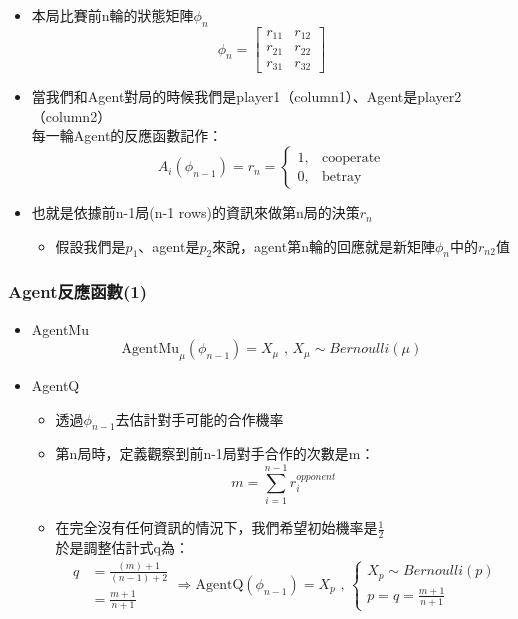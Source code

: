\documentclass[12pt,a4paper]{beamer}
\begin{document}
\begin{CJK}{UTF8}{bsmi}
\begin{frame}
\begin{itemize}
\item 本局比賽前n輪的狀態矩陣$\phi_n$
$$
\phi_n=\begin{bmatrix}
r_{11} & r_{12} \\
r_{21} & r_{22} \\
r_{31} & r_{32} 
\end{bmatrix}
$$
\item 當我們和Agent對局的時候我們是player1（column1）、Agent是player2（column2）\\ 每一輪Agent的反應函數記作：
$$
A_i(\phi_{n-1})=r_n=\left\{\begin{array}{lr} 1, & \text{cooperate} \\ 0, & \text{betray} \end{array} \right.
$$
\item 也就是依據前n-1局(n-1 rows)的資訊來做第n局的決策$r_n$
	\begin{itemize}
	\item 假設我們是$p_1$、agent是$p_2$來說，agent第n輪的回應就是新矩陣$\phi_n$中的$r_{n2}$值
	\end{itemize}

\end{itemize}

\end{frame}

\begin{frame}
\frametitle{Agent反應函數(1)}

\begin{itemize}

\item AgentMu 
$$
 \text{AgentMu}_\mu(\phi_{n-1})=X_\mu\text{ , }X_\mu\sim Bernoulli(\mu)
$$
\item AgentQ
	\begin{itemize}
	\item 透過$\phi_{n-1}$去估計對手可能的合作機率
	\item 第n局時，定義觀察到前n-1局對手合作的次數是m：
	$$
	m=\sum_{i=1}^{n-1} r_i^{opponent}
	$$
	\item 在完全沒有任何資訊的情況下，我們希望初始機率是$\frac{1}{2}$ \\ 於是調整估計式q為：
	$$
	\begin{aligned}
	q
	&=
	\frac{(m)+1}{(n-1)+2}
	\\
	&=
	\frac{m+1}{n+1}
	\end{aligned}
	\Rightarrow\text{AgentQ}(\phi_{n-1})=X_p\text{ , }\begin{cases}
	X_p\sim Bernoulli(p) \\
	p=q=\frac{m+1}{n+1}
	\end{cases}
	$$
	\end{itemize}


\end{itemize}
\end{frame}
\end{CJK}
\end{document}

